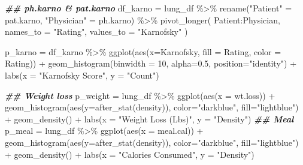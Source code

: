 \documentclass[
]{article}
\newenvironment{Shaded}{\begin{snugshade}}{\end{snugshade}}
\newcommand{\AttributeTok}[1]{\textcolor[rgb]{0.77,0.63,0.00}{#1}}
\newcommand{\DecValTok}[1]{\textcolor[rgb]{0.00,0.00,0.81}{#1}}
\newcommand{\DocumentationTok}[1]{\textcolor[rgb]{0.56,0.35,0.01}{\textbf{\textit{#1}}}}
\newcommand{\FloatTok}[1]{\textcolor[rgb]{0.00,0.00,0.81}{#1}}
\newcommand{\FunctionTok}[1]{\textcolor[rgb]{0.00,0.00,0.00}{#1}}
\newcommand{\NormalTok}[1]{#1}
\newcommand{\OtherTok}[1]{\textcolor[rgb]{0.56,0.35,0.01}{#1}}
\newcommand{\SpecialCharTok}[1]{\textcolor[rgb]{0.00,0.00,0.00}{#1}}
\newcommand{\StringTok}[1]{\textcolor[rgb]{0.31,0.60,0.02}{#1}}
\begin{document}
\begin{Shaded}
\begin{Highlighting}[]
\DocumentationTok{\#\# ph.karno \& pat.karno}
\NormalTok{df\_karno }\OtherTok{=}\NormalTok{ lung\_df }\SpecialCharTok{\%\textgreater{}\%}
  \FunctionTok{rename}\NormalTok{(}\StringTok{"Patient"} \OtherTok{=}\NormalTok{ pat.karno,}
        \StringTok{"Physician"} \OtherTok{=}\NormalTok{ ph.karno) }\SpecialCharTok{\%\textgreater{}\%}
  \FunctionTok{pivot\_longer}\NormalTok{(}
\NormalTok{    Patient}\SpecialCharTok{:}\NormalTok{Physician,}
    \AttributeTok{names\_to =} \StringTok{"Rating"}\NormalTok{,}
    \AttributeTok{values\_to =} \StringTok{"Karnofsky"}
\NormalTok{  )}

\NormalTok{p\_karno }\OtherTok{=}
\NormalTok{  df\_karno }\SpecialCharTok{\%\textgreater{}\%}
  \FunctionTok{ggplot}\NormalTok{(}\FunctionTok{aes}\NormalTok{(}\AttributeTok{x=}\NormalTok{Karnofsky, }\AttributeTok{fill =}\NormalTok{ Rating, }\AttributeTok{color =}\NormalTok{ Rating)) }\SpecialCharTok{+} 
  \FunctionTok{geom\_histogram}\NormalTok{(}\AttributeTok{binwidth =} \DecValTok{10}\NormalTok{, }\AttributeTok{alpha=}\FloatTok{0.5}\NormalTok{, }\AttributeTok{position=}\StringTok{"identity"}\NormalTok{) }\SpecialCharTok{+} 
  \FunctionTok{labs}\NormalTok{(}\AttributeTok{x =} \StringTok{"Karnofsky Score"}\NormalTok{,}
       \AttributeTok{y =} \StringTok{"Count"}\NormalTok{)}

\DocumentationTok{\#\# Weight loss}
\NormalTok{p\_weight }\OtherTok{=}
\NormalTok{  lung\_df }\SpecialCharTok{\%\textgreater{}\%} \FunctionTok{ggplot}\NormalTok{(}\FunctionTok{aes}\NormalTok{(}\AttributeTok{x =}\NormalTok{ wt.loss)) }\SpecialCharTok{+} 
  \FunctionTok{geom\_histogram}\NormalTok{(}\FunctionTok{aes}\NormalTok{(}\AttributeTok{y=}\FunctionTok{after\_stat}\NormalTok{(density)), }\AttributeTok{color=}\StringTok{"darkblue"}\NormalTok{, }\AttributeTok{fill=}\StringTok{"lightblue"}\NormalTok{) }\SpecialCharTok{+}
  \FunctionTok{geom\_density}\NormalTok{() }\SpecialCharTok{+}
    \FunctionTok{labs}\NormalTok{(}\AttributeTok{x =} \StringTok{"Weight Loss (Lbs)"}\NormalTok{,}
       \AttributeTok{y =} \StringTok{"Density"}\NormalTok{)}
\DocumentationTok{\#\# Meal}
\NormalTok{p\_meal }\OtherTok{=}
\NormalTok{  lung\_df }\SpecialCharTok{\%\textgreater{}\%}
  \FunctionTok{ggplot}\NormalTok{(}\FunctionTok{aes}\NormalTok{(}\AttributeTok{x =}\NormalTok{ meal.cal)) }\SpecialCharTok{+} 
  \FunctionTok{geom\_histogram}\NormalTok{(}\FunctionTok{aes}\NormalTok{(}\AttributeTok{y=}\FunctionTok{after\_stat}\NormalTok{(density)), }\AttributeTok{color=}\StringTok{"darkblue"}\NormalTok{, }\AttributeTok{fill=}\StringTok{"lightblue"}\NormalTok{) }\SpecialCharTok{+}
  \FunctionTok{geom\_density}\NormalTok{() }\SpecialCharTok{+}
  \FunctionTok{labs}\NormalTok{(}\AttributeTok{x =} \StringTok{"Calories Consumed"}\NormalTok{,}
       \AttributeTok{y =} \StringTok{"Density"}\NormalTok{)}
\end{Highlighting}
\end{Shaded}
\end{document}
